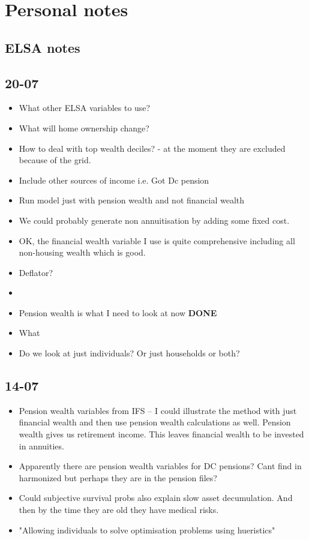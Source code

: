 \documentclass[12pt]{article}
\begin{document}
\section{Personal notes}

\subsection{ELSA notes}
\subsection{\textbf{20-07}}
\begin{itemize}
  \item What other ELSA variables to use?
  \item What will home ownership change?
  \item How to deal with top wealth deciles? - at the moment they are excluded because of the grid.
  \item Include other sources of income i.e. Got Dc pension
  \item Run model just with pension wealth and not financial wealth
  \item We could probably generate non annuitisation by adding some fixed cost.
  \item OK, the financial wealth variable I use is quite comprehensive including all non-housing
        wealth which is good.
  \item Deflator?
  \item

  \item Pension wealth is what I need to look at now \textbf{DONE}
  \item What
  \item Do we look at just individuals? Or just households or both?
\end{itemize}

\subsection{\textbf{14-07}}
\begin{itemize}
  \item Pension wealth variables from IFS -- I could illustrate
        the method with just financial wealth and then use pension wealth calculations
        as well. Pension wealth gives us retirement income. This leaves financial wealth to be
        invested in annuities.

  \item Apparently there are pension wealth variables for DC pensions?
        Cant find in harmonized but perhaps they are in the pension files?

  \item Could subjective survival probs also explain slow asset decumulation. And then by the time they are old
        they have medical risks.

  \item "Allowing individuals to solve optimisation problems using hueristics"
\end{itemize}
\end{document}
